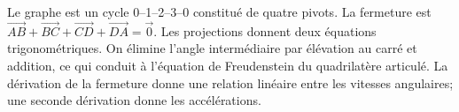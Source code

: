 \begin{corrigebox}
Le graphe est un cycle 0--1--2--3--0 constitué de quatre pivots.
La fermeture est
                $\overrightarrow{AB}+\overrightarrow{BC}+
                \overrightarrow{CD}+\overrightarrow{DA}=\vec0$.
Les projections donnent deux équations trigonométriques. On élimine
                l'angle intermédiaire par élévation au carré et addition, ce qui conduit à
                l'équation de Freudenstein du quadrilatère articulé.
La dérivation de la fermeture donne une relation linéaire entre les
                vitesses angulaires; une seconde dérivation donne les accélérations.
\end{corrigebox}

